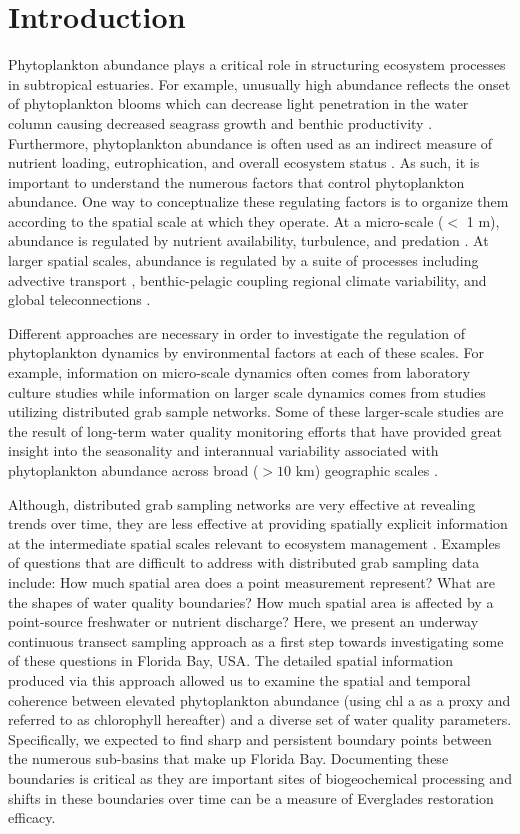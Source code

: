 \section{Introduction}
\label{intro}
Phytoplankton abundance plays a critical role in structuring ecosystem processes in subtropical estuaries. For example, unusually high abundance reflects the onset of phytoplankton blooms which can decrease light penetration in the water column causing decreased seagrass growth and benthic productivity \citep{kelble_2005}. Furthermore, phytoplankton abundance is often used as an indirect measure of nutrient loading, eutrophication, and overall ecosystem status \citep{boyer_2009}. As such, it is important to understand the numerous factors that control phytoplankton abundance. One way to conceptualize these regulating factors is to organize them according to the spatial scale at which they operate. At a micro-scale ($<$ 1 m), abundance is regulated by nutrient availability, turbulence, and predation \cite{mann2013dynamics}. At larger spatial scales, abundance is regulated by a suite of processes including advective transport \cite{dugdale2012river}, benthic-pelagic coupling \cite{zhang_2014, lawrence2004wind} regional climate variability, and global teleconnections \cite{briceno_climatic_2009}.

Different approaches are necessary in order to investigate the regulation of phytoplankton dynamics by environmental factors at each of these scales. For example, information on micro-scale dynamics often comes from laboratory culture studies while information on larger scale dynamics comes from studies utilizing distributed grab sample networks. Some of these larger-scale studies are the result of long-term water quality monitoring efforts that have provided great insight into the seasonality and interannual variability associated with phytoplankton abundance across broad ($>10$ km) geographic scales \cite{cloern_patterns_2010}.

Although, distributed grab sampling networks are very effective at revealing trends over time, they are less effective at providing spatially explicit information at the intermediate spatial scales relevant to ecosystem management \cite{anttila2008feasible}. Examples of questions that are difficult to address with distributed grab sampling data include: How much spatial area does a point measurement represent? What are the shapes of water quality boundaries? How much spatial area is affected by a point-source freshwater or nutrient discharge? Here, we present an underway continuous transect sampling approach as a first step towards investigating some of these questions in Florida Bay, USA. The detailed spatial information produced via this approach allowed us to examine the spatial and temporal coherence between elevated phytoplankton abundance (using chl a as a proxy and referred to as chlorophyll hereafter) and a diverse set of water quality parameters. Specifically, we expected to find sharp and persistent boundary points between the numerous sub-basins that make up Florida Bay. Documenting these boundaries is critical as they are important sites of biogeochemical processing and shifts in these boundaries over time can be a measure of Everglades restoration efficacy.
